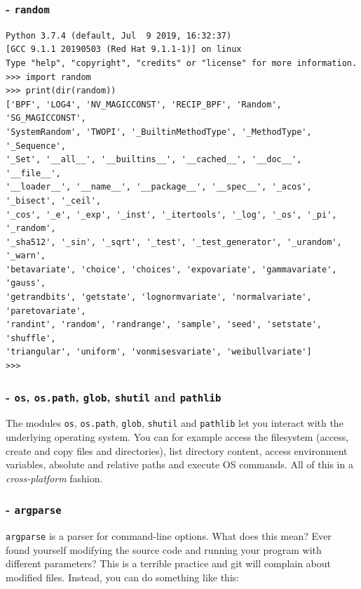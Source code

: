 \subsubsection{- \texttt{random}}
\begin{verbatim}
Python 3.7.4 (default, Jul  9 2019, 16:32:37)
[GCC 9.1.1 20190503 (Red Hat 9.1.1-1)] on linux
Type "help", "copyright", "credits" or "license" for more information.
>>> import random
>>> print(dir(random))
['BPF', 'LOG4', 'NV_MAGICCONST', 'RECIP_BPF', 'Random', 'SG_MAGICCONST',
'SystemRandom', 'TWOPI', '_BuiltinMethodType', '_MethodType', '_Sequence',
'_Set', '__all__', '__builtins__', '__cached__', '__doc__', '__file__',
'__loader__', '__name__', '__package__', '__spec__', '_acos', '_bisect', '_ceil',
'_cos', '_e', '_exp', '_inst', '_itertools', '_log', '_os', '_pi', '_random',
'_sha512', '_sin', '_sqrt', '_test', '_test_generator', '_urandom', '_warn',
'betavariate', 'choice', 'choices', 'expovariate', 'gammavariate', 'gauss',
'getrandbits', 'getstate', 'lognormvariate', 'normalvariate', 'paretovariate',
'randint', 'random', 'randrange', 'sample', 'seed', 'setstate', 'shuffle',
'triangular', 'uniform', 'vonmisesvariate', 'weibullvariate']
>>>
\end{verbatim}

\medskip

\subsubsection{- \texttt{os}, \texttt{os.path}, \texttt{glob}, \texttt{shutil} and \texttt{pathlib}}
The modules \texttt{os}, \texttt{os.path}, \texttt{glob}, \texttt{shutil} and \texttt{pathlib} let you interact with the underlying operating system. You can for example access the filesystem (access, create and copy files and directories), list directory content, access environment variables, absolute and relative paths and execute OS commands. All of this in a \textit{cross-platform} fashion.

\subsubsection{- \texttt{argparse}}
\texttt{argparse} is a parser for command-line options. What does this mean?
Ever found yourself modifying the source code and running your program with different parameters? This is a terrible practice and git will complain about modified files. Instead, you can do something like this:



